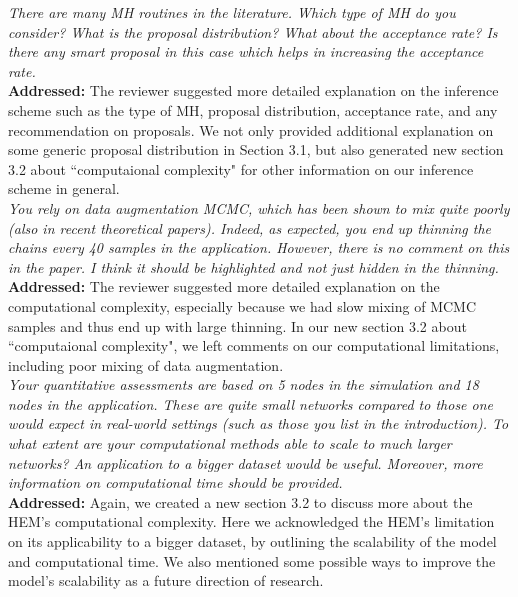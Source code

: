 \documentclass[12pt]{article}
\newcommand{\grey}[1]{{\color{mygrey}#1}}
\theoremstyle{definition}
\begin{document}
 \grey{\emph{There are many MH routines in the literature. Which type of MH do you consider? What is the proposal distribution? What about the acceptance rate? Is there any smart proposal in this case which helps in increasing the acceptance rate.}}\\

\noindent \textcolor{MyGreen}{\textbf{Addressed:}} The reviewer suggested more detailed explanation on the inference scheme such as the type of MH, proposal distribution, acceptance rate, and any recommendation on proposals. We not only provided additional explanation on some generic proposal distribution in Section 3.1, but also generated new section 3.2 about ``computaional complexity" for other information on our inference scheme in general.\\


 \grey{\emph{You rely on data augmentation MCMC, which has been shown to mix quite poorly (also in recent theoretical papers). Indeed, as expected, you end up thinning the chains every 40 samples in the application. However, there is no comment on this in the paper. I think it should be highlighted and not just hidden in the thinning.}}\\

\noindent \textcolor{MyGreen}{\textbf{Addressed:}} The reviewer suggested more detailed explanation on the computational complexity, especially because we had slow mixing of MCMC samples and thus end up with large thinning. In our new section 3.2 about ``computaional complexity", we left comments on our computational limitations, including poor mixing of data augmentation.\\


 \grey{\emph{Your quantitative assessments are based on 5 nodes in the simulation and 18 nodes in the application. These are quite small networks compared to those one would expect in real-world settings (such as those you list in the introduction). To what extent are your computational methods able to scale to much larger networks? An application to a bigger dataset would be useful. Moreover, more information on computational time should be provided.}}\\

\noindent \textcolor{MyGreen}{\textbf{Addressed:}} Again, we created a new section 3.2 to discuss more about the HEM's computational complexity. Here we acknowledged the HEM's limitation on its applicability to a bigger dataset, by outlining the scalability of the model and computational time. We also mentioned some possible ways to improve the model's scalability as a future direction of research. \\
\end{document}
